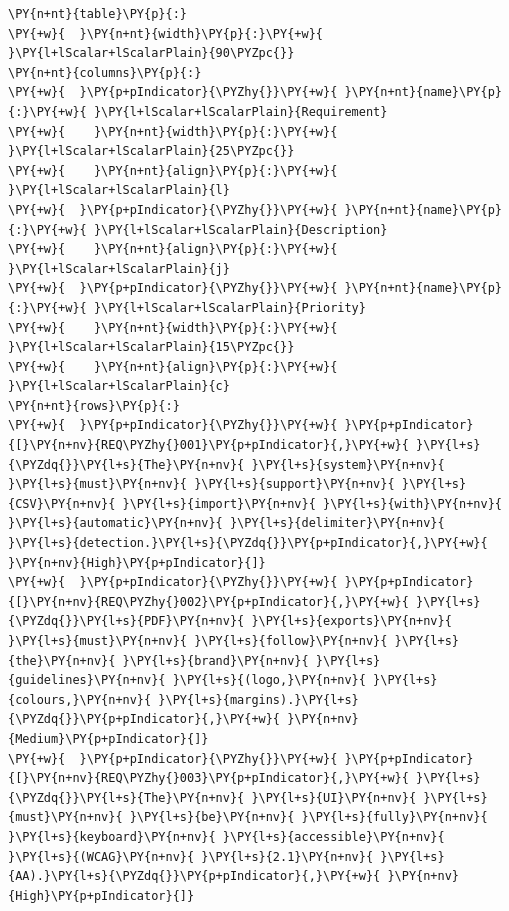 \documentclass[a4paper,twoside]{article}
\begin{document}
\begin{tscode}[lang=yaml, engine=pygments]
\begin{Verbatim}[commandchars=\\\{\},breaklines, breakanywhere, commandchars=\\\{\}]
\PY{n+nt}{table}\PY{p}{:}
\PY{+w}{  }\PY{n+nt}{width}\PY{p}{:}\PY{+w}{ }\PY{l+lScalar+lScalarPlain}{90\PYZpc{}}
\PY{n+nt}{columns}\PY{p}{:}
\PY{+w}{  }\PY{p+pIndicator}{\PYZhy{}}\PY{+w}{ }\PY{n+nt}{name}\PY{p}{:}\PY{+w}{ }\PY{l+lScalar+lScalarPlain}{Requirement}
\PY{+w}{    }\PY{n+nt}{width}\PY{p}{:}\PY{+w}{ }\PY{l+lScalar+lScalarPlain}{25\PYZpc{}}
\PY{+w}{    }\PY{n+nt}{align}\PY{p}{:}\PY{+w}{ }\PY{l+lScalar+lScalarPlain}{l}
\PY{+w}{  }\PY{p+pIndicator}{\PYZhy{}}\PY{+w}{ }\PY{n+nt}{name}\PY{p}{:}\PY{+w}{ }\PY{l+lScalar+lScalarPlain}{Description}
\PY{+w}{    }\PY{n+nt}{align}\PY{p}{:}\PY{+w}{ }\PY{l+lScalar+lScalarPlain}{j}
\PY{+w}{  }\PY{p+pIndicator}{\PYZhy{}}\PY{+w}{ }\PY{n+nt}{name}\PY{p}{:}\PY{+w}{ }\PY{l+lScalar+lScalarPlain}{Priority}
\PY{+w}{    }\PY{n+nt}{width}\PY{p}{:}\PY{+w}{ }\PY{l+lScalar+lScalarPlain}{15\PYZpc{}}
\PY{+w}{    }\PY{n+nt}{align}\PY{p}{:}\PY{+w}{ }\PY{l+lScalar+lScalarPlain}{c}
\PY{n+nt}{rows}\PY{p}{:}
\PY{+w}{  }\PY{p+pIndicator}{\PYZhy{}}\PY{+w}{ }\PY{p+pIndicator}{[}\PY{n+nv}{REQ\PYZhy{}001}\PY{p+pIndicator}{,}\PY{+w}{ }\PY{l+s}{\PYZdq{}}\PY{l+s}{The}\PY{n+nv}{ }\PY{l+s}{system}\PY{n+nv}{ }\PY{l+s}{must}\PY{n+nv}{ }\PY{l+s}{support}\PY{n+nv}{ }\PY{l+s}{CSV}\PY{n+nv}{ }\PY{l+s}{import}\PY{n+nv}{ }\PY{l+s}{with}\PY{n+nv}{ }\PY{l+s}{automatic}\PY{n+nv}{ }\PY{l+s}{delimiter}\PY{n+nv}{ }\PY{l+s}{detection.}\PY{l+s}{\PYZdq{}}\PY{p+pIndicator}{,}\PY{+w}{ }\PY{n+nv}{High}\PY{p+pIndicator}{]}
\PY{+w}{  }\PY{p+pIndicator}{\PYZhy{}}\PY{+w}{ }\PY{p+pIndicator}{[}\PY{n+nv}{REQ\PYZhy{}002}\PY{p+pIndicator}{,}\PY{+w}{ }\PY{l+s}{\PYZdq{}}\PY{l+s}{PDF}\PY{n+nv}{ }\PY{l+s}{exports}\PY{n+nv}{ }\PY{l+s}{must}\PY{n+nv}{ }\PY{l+s}{follow}\PY{n+nv}{ }\PY{l+s}{the}\PY{n+nv}{ }\PY{l+s}{brand}\PY{n+nv}{ }\PY{l+s}{guidelines}\PY{n+nv}{ }\PY{l+s}{(logo,}\PY{n+nv}{ }\PY{l+s}{colours,}\PY{n+nv}{ }\PY{l+s}{margins).}\PY{l+s}{\PYZdq{}}\PY{p+pIndicator}{,}\PY{+w}{ }\PY{n+nv}{Medium}\PY{p+pIndicator}{]}
\PY{+w}{  }\PY{p+pIndicator}{\PYZhy{}}\PY{+w}{ }\PY{p+pIndicator}{[}\PY{n+nv}{REQ\PYZhy{}003}\PY{p+pIndicator}{,}\PY{+w}{ }\PY{l+s}{\PYZdq{}}\PY{l+s}{The}\PY{n+nv}{ }\PY{l+s}{UI}\PY{n+nv}{ }\PY{l+s}{must}\PY{n+nv}{ }\PY{l+s}{be}\PY{n+nv}{ }\PY{l+s}{fully}\PY{n+nv}{ }\PY{l+s}{keyboard}\PY{n+nv}{ }\PY{l+s}{accessible}\PY{n+nv}{ }\PY{l+s}{(WCAG}\PY{n+nv}{ }\PY{l+s}{2.1}\PY{n+nv}{ }\PY{l+s}{AA).}\PY{l+s}{\PYZdq{}}\PY{p+pIndicator}{,}\PY{+w}{ }\PY{n+nv}{High}\PY{p+pIndicator}{]}
\end{Verbatim}
\end{tscode}
\end{document}
